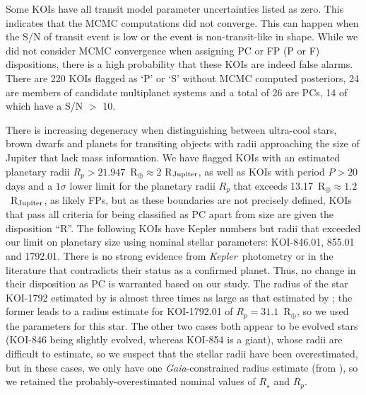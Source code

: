 \documentclass{aastex62}
\newcommand{\ik}{{\it Kepler~}}
\newcommand{\gaiat}{{\it Gaia}}
\begin{document}
Some KOIs have all transit model parameter uncertainties listed as zero.  This indicates that the MCMC computations did not converge.  This can happen when the S/N of transit event is low or the event is non-transit-like in shape.  While we did not consider MCMC convergence when assigning PC or FP (P or F) dispositions, there is a high probability that these KOIs are indeed false alarms.  {There are 220 KOIs flagged as `P' or `S' without MCMC computed posteriors, 24 are members of candidate multiplanet systems and a total of 26 are PCs, 14 of which have a S/N $>$ 10.}

There is increasing degeneracy when distinguishing between ultra-cool stars, brown dwarfs and planets for transiting objects with radii approaching the size of Jupiter that lack mass information.  We have flagged KOIs with an estimated planetary radii $R_p > 21.947$~R$_\oplus \approx 2$ R$_{\rm Jupiter}$, as well as KOIs with period $P>20$ days and a $1 \sigma$ lower limit for the planetary radii $R_p$ that exceeds 13.17~R$_\oplus \approx 1.2$~R$_{\rm Jupiter}$, as likely FPs, but as these boundaries are not precisely defined, KOIs that pass all criteria for being classified as PC apart from size are given the disposition ``R''. {%
The following KOIs have Kepler numbers but radii that exceeded our limit on planetary size using nominal stellar parameters: KOI-846.01, 855.01 and 1792.01.  There is no strong evidence from \ik photometry or in the literature that contradicts their status as a confirmed planet.  Thus, no change in their disposition as PC is warranted based on our study. The radius of the star KOI-1792 estimated by \cite{Fulton:2018} is almost three times as large as that estimated by \cite{Berger:2020a}; the former leads to a radius estimate for KOI-1792.01 of $R_p = 31.1$~R$_\oplus$, so we used the \cite{Berger:2020a} parameters for this star. The other two cases both appear to be evolved stars (KOI-846 being slightly evolved, whereas KOI-854 is a giant), whose radii are difficult to estimate, so we suspect that the stellar radii have been overestimated, but in these cases, we only have one \gaiat-constrained radius estimate (from \citealt{Berger:2020a}), so we retained the probably-overestimated nominal values of $R_\star$ and $R_p$.}
\end{document}
